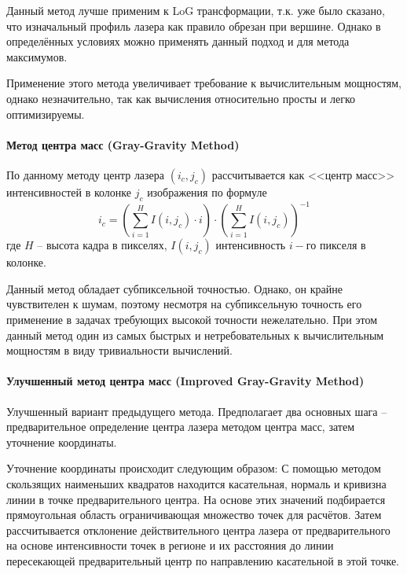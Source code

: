                 Данный метод лучше применим к LoG трансформации, т.к. уже было сказано, что изначальный профиль лазера как правило обрезан при вершине. Однако в определённых условиях можно применять данный подход и для метода максимумов.
                
                Применение этого метода увеличивает требование к вычислительным мощностям, однако незначительно, так как вычисления относительно просты и легко оптимизируемы.
            
            \paragraph{Метод центра масс (Gray-Gravity Method)}
                По данному методу центр лазера $ (i_c, j_c) $ рассчитывается как <<центр масс>> интенсивностей в колонке $ j_c $ изображения по формуле
                \begin{equation}
                    i_c = \left(\sum\limits_{i=1}^{H}I(i, j_c)\cdot i\right)\cdot\left(\sum\limits_{i=1}^{H}I(i, j_c)\right)^{-1}
                \end{equation}
                где $ H $ -- высота кадра в пикселях, $ I(i, j_c) $ интенсивность $ i-\textit{го} $ пикселя в колонке.
                
                
                Данный метод обладает субпиксельной точностью\cite{Li2017}. Однако, он крайне чувствителен к шумам, поэтому несмотря на субпиксельную точность его применение в задачах требующих высокой точности нежелательно. При этом данный метод один из самых быстрых и нетребовательных к вычислительным мощностям в виду тривиальности вычислений.
                
            \paragraph{Улучшенный метод центра масс (Improved Gray-Gravity Method)}
                Улучшенный вариант предыдущего метода\cite{Li2017}. Предполагает два основных шага -- предварительное определение центра лазера методом центра масс, затем уточнение координаты.
                
                Уточнение координаты происходит следующим образом:
                С помощью методом скользящих наименьших квадратов находится касательная, нормаль и кривизна линии в точке предварительного центра. На основе этих значений подбирается прямоугольная область ограничивающая множество точек для расчётов. Затем рассчитывается отклонение действительного центра лазера от предварительного на основе интенсивности точек в регионе и их расстояния до линии пересекающей предварительный центр по направлению касательной в этой точке.
                
